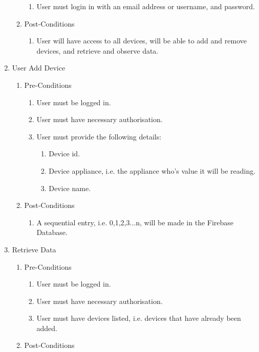 \documentclass{article}
\begin{document}
\begin{enumerate}
\begin{enumerate}
\begin{enumerate}
				\item	User must login in with an email address or username, and password.
			\end{enumerate}
			\item  Post-Conditions		
			\begin{enumerate}
				\item	User will have access to all devices, will be able to add and remove devices, and retrieve and observe 
				data.
			\end{enumerate}
		\end{enumerate}
		\item	User Add Device
		\begin{enumerate}
			\item  Pre-Conditions
			\begin{enumerate}
				\item	User must be logged in.
				\item	User must have necessary authorisation.
				\item	User must provide the following details:
				\begin{enumerate}
					\item	Device id.
					\item	Device appliance, i.e. the appliance who's value it will be reading.
					\item	Device name.
				\end{enumerate}
			\end{enumerate}
			\item  Post-Conditions		
			\begin{enumerate}
				\item	A sequential entry, i.e. 0,1,2,3...n, will be made in the Firebase Database.
			\end{enumerate}
		\end{enumerate}
		\item	Retrieve Data
		\begin{enumerate}
			\item  Pre-Conditions
			\begin{enumerate}
				\item	User must be logged in.
				\item	User must have necessary authorisation.
				\item	User must have devices listed, i.e. devices that have already been added.
			\end{enumerate}
			\item  Post-Conditions		
			\begin{enumerate}

\end{enumerate}
\end{enumerate}
\end{enumerate}
\end{document}
